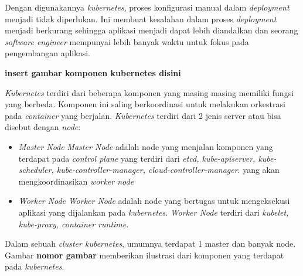 Dengan digunakannya \textit{kubernetes}, proses konfigurasi manual dalam \textit{deployment} menjadi tidak diperlukan.
Ini membuat kesalahan dalam proses \textit{deployment} menjadi berkurang sehingga aplikasi menjadi dapat lebih diandalkan dan
seorang \textit{software engineer} mempunyai lebih banyak waktu untuk fokus pada pengembangan aplikasi.

\textbf{insert gambar komponen kubernetes disini}

\textit{Kubernetes} terdiri dari beberapa komponen yang masing masing memiliki fungsi yang berbeda.
Komponen ini saling berkoordinasi untuk melakukan orkestrasi pada \textit{container} yang berjalan.
\textit{Kubernetes} terdiri dari 2 jenis server atau bisa disebut dengan \textit{node}:
\begin{itemize}
    \item \textit{Master Node}
          \textit{Master Node} adalah node yang menjalan komponen yang terdapat pada \textit{control plane}
          yang terdiri dari \textit{etcd, kube-apiserver, kube-scheduler, kube-controller-manager, cloud-controller-manager}.
          yang akan mengkoordinasikan \textit{worker node}
    \item \textit{Worker Node}
          \textit{Worker Node} adalah node yang bertugas untuk mengeksekusi aplikasi yang dijalankan pada \textit{kubernetes}.
          \textit{Worker Node} terdiri dari \textit{kubelet, kube-proxy, container runtime}.
\end{itemize}
Dalam sebuah \textit{cluster kubernetes}, umumnya terdapat 1 master dan banyak node.
Gambar \textbf{nomor gambar} memberikan ilustrasi dari komponen yang terdapat pada \textit{kubernetes}.

\vspace{0.5cm}
